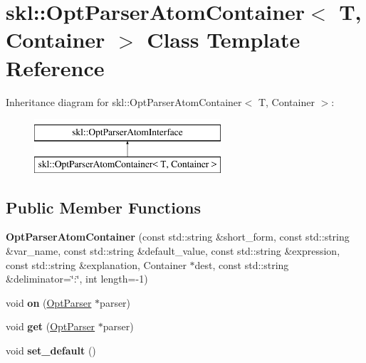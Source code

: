 \hypertarget{classskl_1_1_opt_parser_atom_container}{}\section{skl\+:\+:Opt\+Parser\+Atom\+Container$<$ T, Container $>$ Class Template Reference}
\label{classskl_1_1_opt_parser_atom_container}
Inheritance diagram for skl\+:\+:Opt\+Parser\+Atom\+Container$<$ T, Container $>$\+:\begin{figure}[H]
\begin{center}
\leavevmode
\includegraphics[height=2.000000cm]{classskl_1_1_opt_parser_atom_container}
\end{center}
\end{figure}
\subsection*{Public Member Functions}
\begin{DoxyCompactItemize}
\item 
\hypertarget{classskl_1_1_opt_parser_atom_container_ae641a31bccdd30ef9d39c23e85064a56}{}\label{classskl_1_1_opt_parser_atom_container_ae641a31bccdd30ef9d39c23e85064a56} 
{\bfseries Opt\+Parser\+Atom\+Container} (const std\+::string \&short\+\_\+form, const std\+::string \&var\+\_\+name, const std\+::string \&default\+\_\+value, const std\+::string \&expression, const std\+::string \&explanation, Container $\ast$dest, const std\+::string \&deliminator=\char`\"{}\+:\char`\"{}, int length=-\/1)
\item 
\hypertarget{classskl_1_1_opt_parser_atom_container_a739477fc4eb8ff79384671887adfb3eb}{}\label{classskl_1_1_opt_parser_atom_container_a739477fc4eb8ff79384671887adfb3eb} 
void {\bfseries on} (\hyperlink{classskl_1_1_opt_parser}{Opt\+Parser} $\ast$parser)
\item 
\hypertarget{classskl_1_1_opt_parser_atom_container_a41919b3684566bf4cea0c97f309a4b5f}{}\label{classskl_1_1_opt_parser_atom_container_a41919b3684566bf4cea0c97f309a4b5f} 
void {\bfseries get} (\hyperlink{classskl_1_1_opt_parser}{Opt\+Parser} $\ast$parser)
\item 
\hypertarget{classskl_1_1_opt_parser_atom_container_ae6df89d2c33874c413223afcca62b350}{}\label{classskl_1_1_opt_parser_atom_container_ae6df89d2c33874c413223afcca62b350} 
void {\bfseries set\+\_\+default} ()
\end{DoxyCompactItemize}
